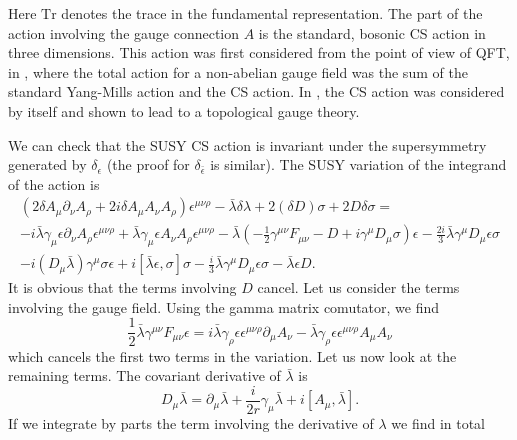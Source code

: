   Here $\mathrm{Tr}$ denotes the trace in the fundamental representation. The
  part of the action involving the gauge connection $A$ is the standard,
  bosonic CS action in three dimensions. This action was first considered
  from the point of view of QFT, in \cite{Deser82}, where the total action for
  a non-abelian gauge field was the sum of the standard Yang-Mills action and
  the CS action. In \cite{Witten89}, the CS action was considered by itself and shown
  to lead to a topological gauge theory.
  \par We can check that the SUSY CS action is invariant under the
  supersymmetry generated by $\delta_\epsilon$ (the proof for
  $\delta_{\bar{\epsilon}}$ is similar). The  SUSY variation of the integrand
  of the action is
  \begin{multline}
    (2\delta A_\mu\partial_\nu A_\rho + 2i\delta A_\mu A_\nu
    A_\rho)\epsilon^{\mu\nu\rho} - \bar{\lambda}\delta\lambda + 2(\delta
    D)\sigma + 2D\delta\sigma = \\-i\bar{\lambda}\gamma_\mu\epsilon\partial_\nu
    A_\rho\epsilon^{\mu\nu\rho} + \bar{\lambda}\gamma_\mu\epsilon A_\nu A_\rho
    \epsilon^{\mu\nu\rho} - \bar{\lambda}(-\frac{1}{2}\gamma^{\mu\nu}F_{\mu\nu}
    - D + i\gamma^\mu D_\mu\sigma)\epsilon
    - \frac{2i}{3}\bar{\lambda}\gamma^\mu D_\mu\epsilon\sigma\\
    -i(D_\mu\bar{\lambda})\gamma^\mu\sigma\epsilon
    + i\left[\bar{\lambda}\epsilon, \sigma\right]\sigma
    - \frac{i}{3}\bar{\lambda}\gamma^\mu D_\mu\epsilon\sigma
    - \bar{\lambda}\epsilon D.
  \end{multline}
  It is obvious that the terms involving $D$ cancel. Let us consider the terms
  involving the gauge field. Using the gamma matrix comutator, we find
  \begin{equation}
    \frac{1}{2}\bar{\lambda}\gamma^{\mu\nu} F_{\mu\nu}\epsilon = i\bar{\lambda}
    \gamma_\rho\epsilon\epsilon^{\mu\nu\rho}\partial_\mu A_\nu
    - \bar{\lambda}\gamma_\rho\epsilon\epsilon^{\mu\nu\rho}A_\mu A_\nu
  \end{equation}
  which cancels the first two terms in the variation. Let us now look at the
  remaining terms. The covariant derivative of $\bar{\lambda}$ is
  \begin{equation}
    D_\mu \bar{\lambda} = \partial_\mu\bar{\lambda}
    + \frac{i}{2r}\gamma_\mu\bar{\lambda} + i\left[A_\mu, \bar{\lambda}\right].
  \end{equation}
  If we integrate by parts the term involving the derivative of $\lambda$ we
  find in total
